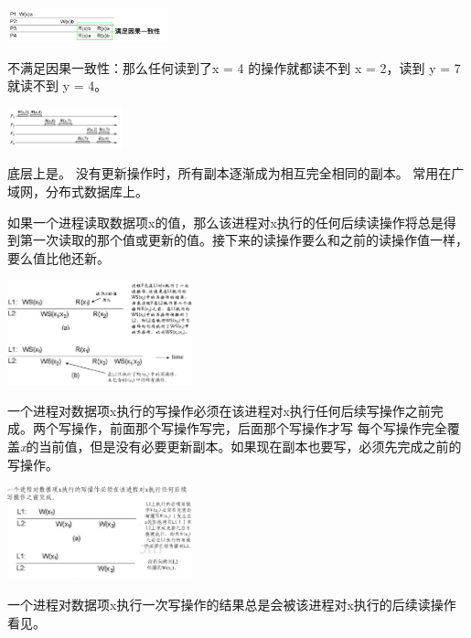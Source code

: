 \documentclass[twoside]{ctexart}
\begin{document}
\begin{multicols}{2}
  \includegraphics[width=0.35\textwidth,keepaspectratio]{pics/consistency_example4.png}

    不满足因果一致性：那么任何读到了x = 4 的操作就都读不到 x = 2，读到 y = 7 就读不到 y = 4。
    
    \includegraphics[width=0.25\textwidth,keepaspectratio]{pics/causal.png}
    
   底层上是。  没有更新操作时，所有副本逐渐成为相互完全相同的副本。 常用在广域网，分布式数据库上。
  
   如果一个进程读取数据项x的值，那么该进程对x执行的任何后续读操作将总是得到第一次读取的那个值或更新的值。接下来的读操作要么和之前的读操作值一样，要么值比他还新。

  \includegraphics[width=0.4\textwidth,keepaspectratio]{pics/mono-read.png}

   一个进程对数据项x执行的写操作必须在该进程对x执行任何后续写操作之前完成。两个写操作，前面那个写操作写完，后面那个写操作才写 每个写操作完全覆盖\emph{x}的当前值，但是没有必要更新副本。如果现在副本也要写，必须先完成之前的写操作。

  \includegraphics[width=0.4\textwidth,keepaspectratio]{pics/mono-write.png}

   一个进程对数据项x执行一次写操作的结果总是会被该进程对x执行的后续读操作看见。
    

\end{multicols}
\end{document}
